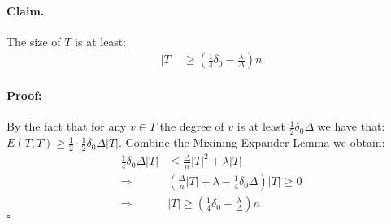\documentclass{article}
\begin{document}
\begin{multicols*}{2}
  \paragraph{Claim.} The size of $T$ is at least:
  \begin{equation*}
    \begin{split}
      |T| & \ge \left( \frac{1}{4}\delta_{0} - \frac{\lambda}{\Delta} \right)n 
    \end{split}
  \end{equation*}
  \paragraph{Proof:} By the fact that for any $v \in T$ the degree of $v$ is at least $\frac{1}{2}\delta_{0}\Delta$ we have that: $E\left( T,T \right) \ge \frac{1}{2}\cdot \frac{1}{2}\delta_{0}\Delta |T|$. Combine the Mixining Expander Lemma we obtain:
  \begin{equation*}
    \begin{split}
      \frac{1}{4}\delta_{0}\Delta |T| & \le \frac{\Delta}{n}|T|^2  + \lambda|T| \\ 
      \Rightarrow & \left( \frac{\Delta}{n}|T| + \lambda -  \frac{1}{4}\delta_{0}\Delta \right)|T| \ge 0 \\ 
      \Rightarrow & |T| \ge \left( \frac{1}{4}\delta_{0} - \frac{\lambda}{\Delta} \right)n 
    \end{split}
  \end{equation*}
  $\square$


\end{multicols*}
\end{document}
